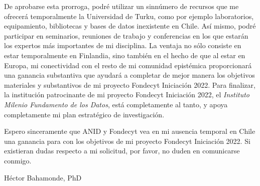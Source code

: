 \documentclass[9pt,stdletter,dateno,sigleft,openany]{newlfm} %
\begin{document}
\begin{newlfm}
De aprobarse esta prorroga, podr\'e utilizar un sinn\'umero de recursos que me ofrecer\'a temporalmente la Universidad de Turku, como por ejemplo laboratorios, equipamiento, bibliotecas y bases de datos inexistente en Chile. As\'i mismo, podr\'e participar en seminarios, reuniones de trabajo y conferencias en los que estar\'an los expertos m\'as importantes de mi disciplina. La ventaja no s\'olo consiste en estar temporalmente en Finlandia, sino tambi\'en en el hecho de que al estar en Europa, mi conectividad con el resto de mi comunidad epist\'emica proporcionar\'a una ganancia substantiva que ayudar\'a a completar de mejor manera los objetivos materiales y substantivos de mi proyecto Fondecyt Iniciaci\'on 2022. Para finalizar, la instituci\'on patrocinante de mi proyecto Fondecyt Iniciaci\'on 2022, el \emph{Instituto Milenio Fundamento de los Datos}, est\'a completamente al tanto, y apoya completamente mi plan estrat\'egico de investigaci\'on.

Espero sinceramente que ANID y Fondecyt vea en mi ausencia temporal en Chile una ganancia para con los objetivos de mi proyecto Fondecyt Iniciaci\'on 2022. Si existieran dudas respecto a mi solicitud, por favor, no duden en comunicarse conmigo.

{\vspace{0.5cm}\hspace{10cm}H\'ector Bahamonde, PhD}


\end{newlfm}
\end{document}
